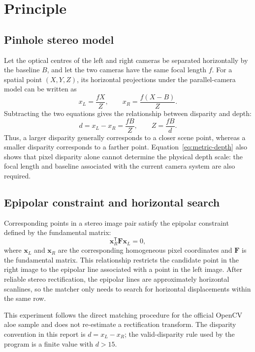 \section{Principle}

\subsection{Pinhole stereo model}

Let the optical centres of the left and right cameras be separated horizontally by the baseline $B$, and let the two cameras have the same focal length $f$. For a spatial point $(X,Y,Z)$, its horizontal projections under the parallel-camera model can be written as
\begin{equation}
  x_L=\frac{fX}{Z},\qquad
  x_R=\frac{f(X-B)}{Z}.
\end{equation}
Subtracting the two equations gives the relationship between disparity and depth:
\begin{equation}
  d=x_L-x_R=\frac{fB}{Z},\qquad
  Z=\frac{fB}{d}.
  \label{eq:metric-depth}
\end{equation}
Thus, a larger disparity generally corresponds to a closer scene point, whereas a smaller disparity corresponds to a farther point. Equation~\eqref{eq:metric-depth} also shows that pixel disparity alone cannot determine the physical depth scale: the focal length and baseline associated with the current camera system are also required.

\subsection{Epipolar constraint and horizontal search}

Corresponding points in a stereo image pair satisfy the epipolar constraint defined by the fundamental matrix:
\begin{equation}
  \mathbf{x}_R^{\mathsf{T}}\mathbf{F}\mathbf{x}_L=0,
\end{equation}
where $\mathbf{x}_L$ and $\mathbf{x}_R$ are the corresponding homogeneous pixel coordinates and $\mathbf{F}$ is the fundamental matrix. This relationship restricts the candidate point in the right image to the epipolar line associated with a point in the left image. After reliable stereo rectification, the epipolar lines are approximately horizontal scanlines, so the matcher only needs to search for horizontal displacements within the same row.

This experiment follows the direct matching procedure for the official OpenCV aloe sample and does not re-estimate a rectification transform. The disparity convention in this report is $d=x_L-x_R$; the valid-disparity rule used by the program is a finite value with $d>15$.

